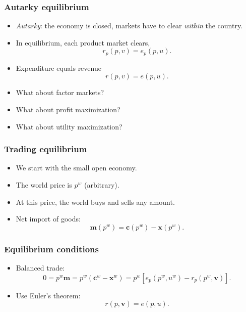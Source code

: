 \documentclass[compress,mathserif,aspectratio=169]{beamer}
\begin{document}
\begin{frame}\frametitle{Autarky equilibrium}\hypertarget{Autarky equilibrium}{}
\begin{itemize}
\item \emph{Autarky}: the economy is closed, markets have to clear \emph{within} the country.

\item In equilibrium, each product market clears,
\[
r_p(p,v) = e_p(p,u).
\]

\item Expenditure equals revenue
\[
r(p,v) = e(p,u).
\]
\pause



\item What about factor markets?

\item What about profit maximization?

\item What about utility maximization?


\end{itemize}
\end{frame}



\begin{frame}\frametitle{Trading equilibrium}\hypertarget{Trading equilibrium}{}
\begin{itemize}
\item We start with the small open economy.

\item The world price is $p^w$ (arbitrary).

\item At this price, the world buys and sells any amount.

\item Net import of goods: 
\[
\mathbf m(p^w) = \mathbf c(p^w) - \mathbf x(p^w).
\]


\end{itemize}
\end{frame}



\begin{frame}\frametitle{Equilibrium conditions}\hypertarget{Equilibrium conditions}{}
\begin{itemize}
\item Balanced trade:
\[
0 = p^w \mathbf m = p^w(\mathbf c^w-\mathbf x^w) = 
p^w[e_p(p^w,u^w) - r_p(p^w,\mathbf v)].
\]

\item Use Euler's theorem:
\[
r(p,\mathbf v) = e(p,u).
\]




\end{itemize}
\end{frame}
\end{document}
